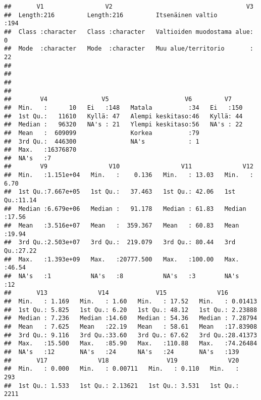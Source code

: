 \documentclass[
]{article}
\begin{document}
\begin{verbatim}
##       V1                 V2                                     V3     
##  Length:216         Length:216         Itsenäinen valtio         :194  
##  Class :character   Class :character   Valtioiden muodostama alue:  0  
##  Mode  :character   Mode  :character   Muu alue/territorio       : 22  
##                                                                        
##                                                                        
##                                                                        
##                                                                        
##        V4               V5                     V6         V7     
##  Min.   :      10   Ei   :148   Matala          :34   Ei   :150  
##  1st Qu.:   11610   Kyllä: 47   Alempi keskitaso:46   Kyllä: 44  
##  Median :   96320   NA's : 21   Ylempi keskitaso:56   NA's : 22  
##  Mean   :  609099               Korkea          :79              
##  3rd Qu.:  446300               NA's            : 1              
##  Max.   :16376870                                                
##  NA's   :7                                                       
##        V9                 V10                 V11              V12       
##  Min.   :1.151e+04   Min.   :    0.136   Min.   : 13.03   Min.   : 6.70  
##  1st Qu.:7.667e+05   1st Qu.:   37.463   1st Qu.: 42.06   1st Qu.:11.14  
##  Median :6.679e+06   Median :   91.178   Median : 61.83   Median :17.56  
##  Mean   :3.516e+07   Mean   :  359.367   Mean   : 60.83   Mean   :19.94  
##  3rd Qu.:2.503e+07   3rd Qu.:  219.079   3rd Qu.: 80.44   3rd Qu.:27.22  
##  Max.   :1.393e+09   Max.   :20777.500   Max.   :100.00   Max.   :46.54  
##  NA's   :1           NA's   :8           NA's   :3        NA's   :12     
##       V13              V14             V15              V16          
##  Min.   : 1.169   Min.   : 1.60   Min.   : 17.52   Min.   : 0.01413  
##  1st Qu.: 5.825   1st Qu.: 6.20   1st Qu.: 48.12   1st Qu.: 2.23888  
##  Median : 7.236   Median :14.60   Median : 54.36   Median : 7.28794  
##  Mean   : 7.625   Mean   :22.19   Mean   : 58.61   Mean   :17.83908  
##  3rd Qu.: 9.116   3rd Qu.:33.60   3rd Qu.: 67.62   3rd Qu.:28.41373  
##  Max.   :15.500   Max.   :85.90   Max.   :110.88   Max.   :74.26484  
##  NA's   :12       NA's   :24      NA's   :24       NA's   :139       
##       V17              V18                V19              V20        
##  Min.   : 0.000   Min.   : 0.00711   Min.   : 0.110   Min.   :   293  
##  1st Qu.: 1.533   1st Qu.: 2.13621   1st Qu.: 3.531   1st Qu.:  2211  

\end{verbatim}
\end{document}
